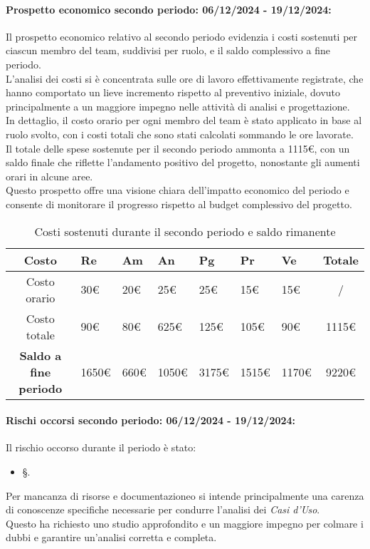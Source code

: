 \paragraph{Prospetto economico secondo periodo: 06/12/2024 - 19/12/2024: }
Il prospetto economico relativo al secondo periodo evidenzia i costi sostenuti per ciascun membro del team, suddivisi per ruolo, e il saldo complessivo a fine periodo.\\
L'analisi dei costi si è concentrata sulle ore di lavoro effettivamente registrate, che hanno comportato un lieve incremento rispetto al preventivo iniziale, dovuto principalmente a un maggiore impegno nelle attività di analisi e progettazione. \\
In dettaglio, il costo orario per ogni membro del team è stato applicato in base al ruolo svolto, con i costi totali che sono stati calcolati sommando le ore lavorate. \\
Il totale delle spese sostenute per il secondo periodo ammonta a 1115€, con un saldo finale che riflette l'andamento positivo del progetto, nonostante gli aumenti orari in alcune aree.\\
Questo prospetto offre una visione chiara dell'impatto economico del periodo e consente di monitorare il progresso rispetto al budget complessivo del progetto.
\begin{table}[!h]
    \centering
    \renewcommand{\arraystretch}{1.5}
    \begin{tabularx}{\textwidth}{|c|X|X|X|X|X|X|c|}\hline
    \rowcolor[HTML]{FFD700} 
    \textbf{Costo} & \textbf{Re} & \textbf{Am} & \textbf{An} & \textbf{Pg} & \textbf{Pr} & \textbf{Ve} & \textbf{Totale} \\ \hline
    Costo orario & 30€ & 20€ & 25€ & 25€ & 15€ & 15€ & /  \\ \hline
    Costo totale & 90€ & 80€ & 625€ & 125€ & 105€ & 90€ & 1115€ \\ \hline
    \rowcolor[HTML]{FFD700} 
    \textbf{Saldo a fine periodo}  & 1650€ & 660€  & 1050€ & 3175€ & 1515€ & 1170€ & 9220€ \\ \hline
    \end{tabularx}
    \caption{Costi sostenuti durante il secondo periodo e saldo rimanente}
\end{table}


\paragraph{Rischi occorsi secondo periodo: 06/12/2024 - 19/12/2024: }
Il rischio occorso durante il periodo è stato:
\begin{itemize}
    \item \S{}.
\end{itemize}
Per mancanza di risorse e documentazioneo si intende principalmente una carenza di conoscenze specifiche necessarie per condurre l’analisi dei \emph{Casi d’Uso}.\\
Questo ha richiesto uno studio approfondito e un maggiore impegno per colmare i dubbi e garantire un’analisi corretta e completa. 


